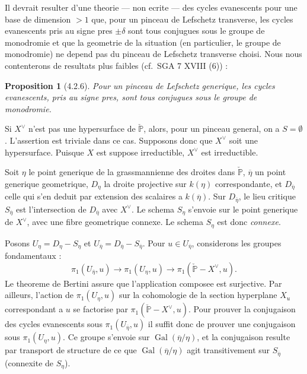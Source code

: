 \documentclass[12pt,a4paper]{article}
\theoremstyle{plain}
\newtheorem{proposition}[theorem]{Proposition}
\theoremstyle{definition}
\theoremstyle{remark}
\DeclareMathOperator{\Gal}{Gal}
\newcommand{\bbP}{\mathbb{P}}
\begin{document}
Il devrait resulter d'une theorie --- non ecrite --- des cycles evanescents pour une base de dimension $> 1$ que, pour un pinceau de Lefschetz transverse, les cycles evanescents pris au signe pres $\pm \delta$ sont tous conjugues sous le groupe de monodromie et que la geometrie de la situation (en particulier, le groupe de monodromie) ne depend pas du pinceau de Lefschetz transverse choisi. Nous nous contenterons de resultats plus faibles (cf.~SGA 7 XVIII (6)) :

\begin{proposition}[4.2.6]
Pour un pinceau de Lefschetz generique, les cycles evanescents, pris au signe pres, sont tous conjugues sous le groupe de monodromie.
\end{proposition}

Si $X^\vee$ n'est pas une hypersurface de $\check{\bbP}$, alors, pour un pinceau general, on a $S = \emptyset$. L'assertion est triviale dans ce cas. Supposons donc que $X^\vee$ soit une hypersurface. Puisque $X$ est suppose irreductible, $X^\vee$ est irreductible.

Soit $\eta$ le point generique de la grassmannienne des droites dans $\check{\bbP}$, $\overline{\eta}$ un point generique geometrique, $D_\eta$ la droite projective sur $k(\eta)$ correspondante, et $D_{\overline{\eta}}$ celle qui s'en deduit par extension des scalaires a $k(\overline{\eta})$. Sur $D_{\overline{\eta}}$, le lieu critique $S_{\overline{\eta}}$ est l'intersection de $D_{\overline{\eta}}$ avec $X^\vee$. Le schema $S_\eta$ s'envoie sur le point generique de $X^\vee$, avec une fibre geometrique connexe. Le schema $S_\eta$ est donc \emph{connexe}.

Posons $U_\eta = D_\eta - S_\eta$ et $U_{\overline{\eta}} = D_{\overline{\eta}} - S_{\overline{\eta}}$. Pour $u \in U_{\overline{\eta}}$, considerons les groupes fondamentaux :
\[
\pi_1(U_{\overline{\eta}}, u) \to \pi_1(U_\eta, u) \to \pi_1(\check{\bbP} - X^\vee, u).
\]
Le theoreme de Bertini assure que l'application composee est surjective. Par ailleurs, l'action de $\pi_1(U_\eta, u)$ sur la cohomologie de la section hyperplane $X_u$ correspondant a $u$ se factorise par $\pi_1(\check{\bbP} - X^\vee, u)$. Pour prouver la conjugaison des cycles evanescents sous $\pi_1(U_{\overline{\eta}}, u)$ il suffit donc de prouver une conjugaison sous $\pi_1(U_\eta, u)$. Ce groupe s'envoie sur $\Gal(\overline{\eta}/\eta)$, et la conjugaison resulte par transport de structure de ce que $\Gal(\overline{\eta}/\eta)$ agit transitivement sur $S_{\overline{\eta}}$ (connexite de $S_\eta$).
\end{document}
